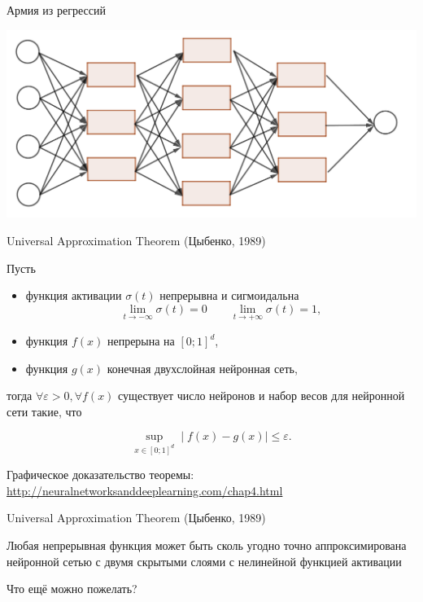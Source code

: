 \documentclass[notes,12pt, aspectratio=169]{beamer}
\newenvironment{wideitemize}{\itemize\addtolength{\itemsep}{10pt}}{\enditemize}
\begin{document}
\begin{frame}{Армия из регрессий}
	\begin{center}
		\includegraphics[width=0.8\paperwidth]{network.png}
	\end{center}
\end{frame}


\begin{frame}{Universal Approximation Theorem (Цыбенко, 1989)}
	
	Пусть 
	
\vspace{2mm}
	
	\begin{itemize}
		\item функция активации $\sigma(t)$ непрерывна и сигмоидальна 
		\[
		\lim_{t \to -\infty} \sigma(t) = 0 \qquad  \lim_{t \to +\infty} \sigma(t) = 1,
		\]
		\item функция $f(x)$ непрерына на $[0;1]^d$,
		\item функция $g(x)$ конечная двухслойная нейронная сеть,
	\end{itemize}

\vspace{2mm}

тогда  $\forall \varepsilon > 0, \forall f(x)$ существует число нейронов и набор весов для нейронной сети такие, что 

\[
\sup_{x \in [0;1]^d}  \mid f(x) - g(x) \mid \le \varepsilon.
\]

\vfill %
\footnotesize Графическое доказательство теоремы:  \\
\color{blue} \url{http://neuralnetworksanddeeplearning.com/chap4.html}
\end{frame}



\begin{frame}{Universal Approximation Theorem (Цыбенко, 1989)}
	\begin{wideitemize}		
		\item Любая непрерывная функция может быть сколь угодно точно аппроксимирована нейронной сетью с двумя скрытыми слоями с нелинейной функцией активации
		
		\item Что ещё можно пожелать?
	\end{wideitemize}

\end{frame}
\end{document}
